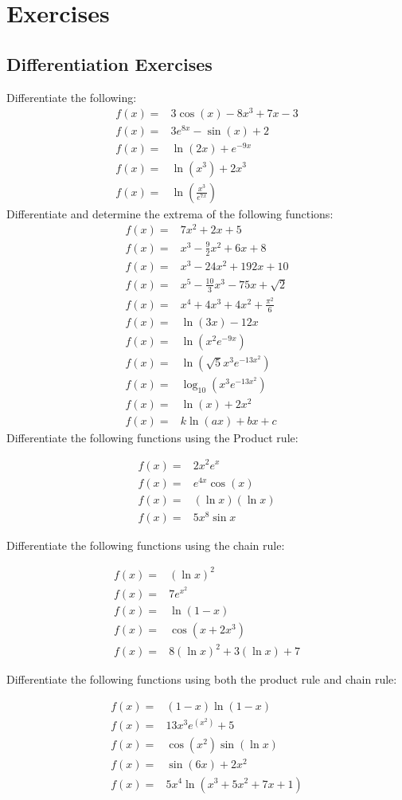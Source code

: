 \documentclass[main.tex]{subfiles}
\begin{document}
\section{Exercises}
\subsection{Differentiation Exercises}
Differentiate the following:
\begin{align}
f(x) =& 3 \cos(x)-8x^3+7x-3\\
f(x) =& 3e^{8x}-\sin(x)+2\\
f(x) =& \ln(2x) + e^{-9x}\\
f(x) =& \ln(x^3)+2x^3\\
f(x) =& \ln\left(\frac{x^3}{e^{7x}}\right)
\end{align}
Differentiate and determine the extrema of the following functions:
\begin{align}
f(x) =& 7x^2+2x+5\\
f(x) =& x^3-\frac{9}{2}x^2+6x+8\\
f(x) =& x^3-24x^2+192x+10\\
f(x) =& x^5-\frac{10}{3}x^3-75x+\sqrt{2}\\
f(x) =& x^4+4x^3+4x^2+\frac{\pi^2}{6}\\
f(x) =& \ln(3x)-12x\\
f(x) =& \ln(x^2e^{-9x})\\
f(x) =& \ln(\sqrt{5}x^3e^{-13x^2})\\
f(x) =& \log_{10}(x^3e^{-13x^2})\\
f(x) =& \ln(x) + 2x^2\\
f(x) =& k\ln(ax) + bx+c
\end{align}
Differentiate the following functions using the Product rule:

\begin{align}
f(x) =& 2x^2e^x\\
f(x) =& e^{4x}\cos(x)\\
f(x) =& (\ln{x})(\ln{x})\\
f(x) =& 5x^8\sin{x}
\end{align}

Differentiate the following functions using the chain rule:

\begin{align}
f(x) =& (\ln{x})^2\\
f(x) =& 7e^{x^2}\\
f(x) =& \ln{(1-x)}\\
f(x) =& \cos{(x+2x^3)}\\
f(x) =& 8(\ln{x})^2 + 3 (\ln{x}) + 7
\end{align}

Differentiate the following functions using both the product rule and chain rule:

\begin{align}
f(x) =& (1-x)\ln{(1-x)}\\
f(x) =& 13x^3e^{(x^2)} + 5\\
f(x) =& \cos{(x^2)}\sin{(\ln{x})}\\
f(x) =& \sin{(6x)} + 2x^2\\
f(x) =& 5x^4\ln{(x^3 + 5x^2 + 7x + 1)}
\end{align}
\end{document}
